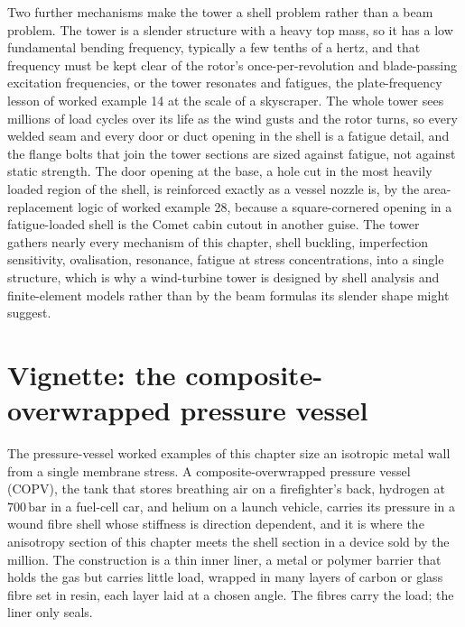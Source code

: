 Two further mechanisms make the tower a shell problem rather than a beam
problem. The tower is a slender structure with a heavy top mass, so it has a
low fundamental bending frequency, typically a few tenths of a hertz, and
that frequency must be kept clear of the rotor's once-per-revolution and
blade-passing excitation frequencies, or the tower resonates and fatigues,
the plate-frequency lesson of worked example 14 at the scale of a
skyscraper. The whole tower sees millions of load cycles over its life as
the wind gusts and the rotor turns, so every welded seam and every door or
duct opening in the shell is a fatigue detail, and the flange bolts that
join the tower sections are sized against fatigue, not against static
strength. The door opening at the base, a hole cut in the most heavily
loaded region of the shell, is reinforced exactly as a vessel nozzle is,
by the area-replacement logic of worked example 28, because a
square-cornered opening in a fatigue-loaded shell is the Comet cabin cutout
in another guise. The tower gathers nearly every mechanism of this chapter,
shell buckling, imperfection sensitivity, ovalisation, resonance, fatigue at
stress concentrations, into a single structure, which is why a wind-turbine
tower is designed by shell analysis and finite-element models rather than by
the beam formulas its slender shape might suggest.

\section{Vignette: the composite-overwrapped pressure vessel}

The pressure-vessel worked examples of this chapter size an isotropic metal
wall from a single membrane stress. A composite-overwrapped pressure vessel
(COPV), the tank that stores breathing air on a firefighter's back, hydrogen
at $700\,\text{bar}$ in a fuel-cell car, and helium on a launch vehicle,
carries its pressure in a wound fibre shell whose stiffness is direction
dependent, and it is where the anisotropy section of this chapter meets the
shell section in a device sold by the million. The construction is a thin
inner liner, a metal or polymer barrier that holds the gas but carries little
load, wrapped in many layers of carbon or glass fibre set in resin, each layer
laid at a chosen angle. The fibres carry the load; the liner only seals.

